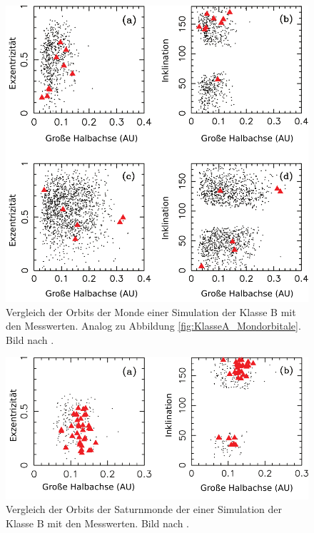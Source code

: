 \documentclass[12pt,a4paper,twoside,open=right,bibliography=totoc]{scrbook}
\renewcommand{\cite}{ \citep}
\begin{document}
\begin{figure}[tbn]
\centering
\includegraphics[scale=0.7]{img/Nesvorny2007-5}
\caption{Vergleich der Orbits der Monde einer Simulation der Klasse B mit den Messwerten. Analog zu Abbildung \ref{fig:KlasseA_Mondorbitale}. Bild nach \cite{Nesvorny2007}.} 
\label{fig:KlasseB_Mondorbitale}
\end{figure}

\begin{figure}[tbn] %
\centering
\includegraphics[scale=0.7]{img/Nesvorny2007-6ab}
\caption{Vergleich der Orbits der Saturnmonde der einer Simulation der Klasse B mit den Messwerten. Bild nach \cite{Nesvorny2007}.} 
\label{fig:Saturnmondorbitale}
\end{figure}
\end{document}
